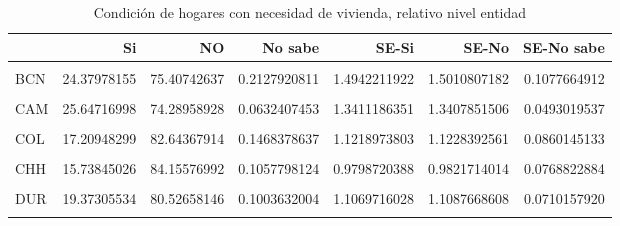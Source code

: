 \documentclass[
]{article}
\begin{document}
\begin{table}[H]

\caption{\label{tab:unnamed-chunk-16}Condición de hogares con necesidad de vivienda, 
    relativo nivel entidad}
\centering
\begin{tabular}[t]{lrrrrrr}
\toprule
  & Si & NO & No sabe & SE-Si & SE-No & SE-No sabe\\
\midrule
\cellcolor{gray!6}{AGU} & \cellcolor{gray!6}{15.46245318} & \cellcolor{gray!6}{84.26829575} & \cellcolor{gray!6}{0.2692510747} & \cellcolor{gray!6}{0.9173243600} & \cellcolor{gray!6}{0.9131692986} & \cellcolor{gray!6}{0.1194644400}\\
BCN & 24.37978155 & 75.40742637 & 0.2127920811 & 1.4942211922 & 1.5010807182 & 0.1077664912\\
\cellcolor{gray!6}{BCS} & \cellcolor{gray!6}{26.07038717} & \cellcolor{gray!6}{73.92961283} & \cellcolor{gray!6}{0.0000000000} & \cellcolor{gray!6}{1.5627555969} & \cellcolor{gray!6}{1.5627555969} & \cellcolor{gray!6}{0.0000000000}\\
CAM & 25.64716998 & 74.28958928 & 0.0632407453 & 1.3411186351 & 1.3407851506 & 0.0493019537\\
\cellcolor{gray!6}{COA} & \cellcolor{gray!6}{17.94489524} & \cellcolor{gray!6}{81.85347795} & \cellcolor{gray!6}{0.2016268065} & \cellcolor{gray!6}{1.0390495679} & \cellcolor{gray!6}{1.0544507667} & \cellcolor{gray!6}{0.1023115714}\\
\addlinespace
COL & 17.20948299 & 82.64367914 & 0.1468378637 & 1.1218973803 & 1.1228392561 & 0.0860145133\\
\cellcolor{gray!6}{CHP} & \cellcolor{gray!6}{27.45335422} & \cellcolor{gray!6}{72.41236455} & \cellcolor{gray!6}{0.1342812223} & \cellcolor{gray!6}{1.2105917646} & \cellcolor{gray!6}{1.2190243948} & \cellcolor{gray!6}{0.0962142745}\\
CHH & 15.73845026 & 84.15576992 & 0.1057798124 & 0.9798720388 & 0.9821714014 & 0.0768822884\\
\cellcolor{gray!6}{CMX} & \cellcolor{gray!6}{27.02794793} & \cellcolor{gray!6}{72.85238613} & \cellcolor{gray!6}{0.1196659465} & \cellcolor{gray!6}{1.2233667823} & \cellcolor{gray!6}{1.2256745014} & \cellcolor{gray!6}{0.0847155908}\\
DUR & 19.37305534 & 80.52658146 & 0.1003632004 & 1.1069716028 & 1.1087668608 & 0.0710157920\\
\addlinespace
\cellcolor{gray!6}{GUA} & \cellcolor{gray!6}{19.78255133} & \cellcolor{gray!6}{79.94889854} & \cellcolor{gray!6}{0.2685501238} & \cellcolor{gray!6}{1.0433200798} & \cellcolor{gray!6}{1.0429584614} & \cellcolor{gray!6}{0.1219704690}\\

\end{tabular}
\end{table}
\end{document}
